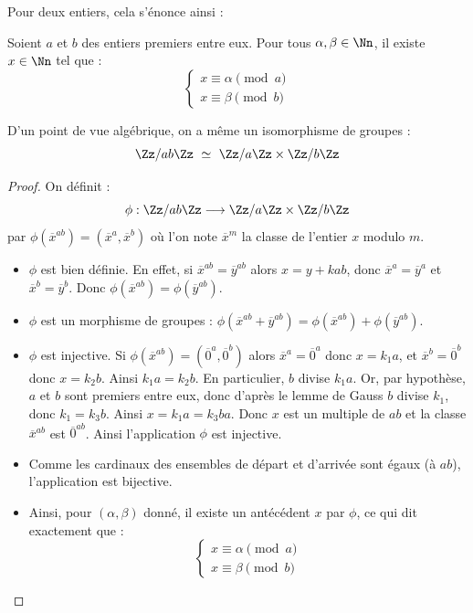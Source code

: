 \documentclass[11pt,class=report,crop=false]{standalone}
\begin{document}
Pour deux entiers, cela s'énonce ainsi :

\begin{theoreme}
    Soient $a$ et $b$ des entiers premiers entre eux. Pour tous $\alpha, \beta \in \Nn$, il existe $x \in \Nn$ tel que :
    \[ \begin{cases}
        x \equiv \alpha \pmod a \\
        x \equiv \beta \pmod b
    \end{cases} \]
\end{theoreme}


D'un point de vue algébrique, on a même un isomorphisme de groupes :
\[ \Zz/ab\Zz \ \simeq \  \Zz/a\Zz \times \Zz/b\Zz \]

\begin{proof}
    On définit :
    \[ \phi : \Zz/ab\Zz \longrightarrow \Zz/a\Zz \times \Zz/b\Zz \]
    par $\phi(\overline{x}^{ab}) = (\overline{x}^a, \overline{x}^b)$ où l'on note $\overline{x}^m$ la classe de l'entier $x$ modulo $m$.
    
    \begin{itemize}
        \item $\phi$ est bien définie. En effet, si $\overline{x}^{ab} = \overline{y}^{ab}$ alors $x = y + kab$, donc $\overline{x}^a = \overline{y}^a$ et $\overline{x}^b = \overline{y}^b$. Donc $\phi(\overline{x}^{ab}) = \phi(\overline{y}^{ab})$.
        
        \item $\phi$ est un morphisme de groupes : $\phi(\overline{x}^{ab}+\overline{y}^{ab}) = \phi(\overline{x}^{ab}) + \phi(\overline{y}^{ab})$.
        
        \item $\phi$ est injective. Si $\phi(\overline{x}^{ab}) = (\overline{0}^a, \overline{0}^b)$ alors $\overline{x}^a = \overline{0}^a$ donc $x = k_1 a$, et $\overline{x}^b = \overline{0}^b$ donc $x = k_2 b$.
        Ainsi $k_1 a = k_2 b$. En particulier, $b$ divise $k_1 a$. Or, par hypothèse, $a$ et $b$ sont premiers entre eux, donc d'après le lemme de Gauss $b$ divise $k_1$, donc $k_1 = k_3 b$.
        Ainsi $x = k_1 a = k_3 b a$. Donc $x$ est un multiple de $ab$ et
        la classe $\overline{x}^{ab}$ est $\overline{0}^{ab}$.
        Ainsi l'application $\phi$ est injective.

        \item Comme les cardinaux des ensembles de départ et d'arrivée sont égaux (à $ab$), l'application est bijective.
        
        
        \item Ainsi, pour $(\alpha, \beta)$ donné, il existe un antécédent $x$ par $\phi$, ce qui dit exactement que :
        \[ \begin{cases}
            x \equiv \alpha \pmod a \\
            x \equiv \beta \pmod b
        \end{cases} \]
    \end{itemize}
\end{proof}
\end{document}
